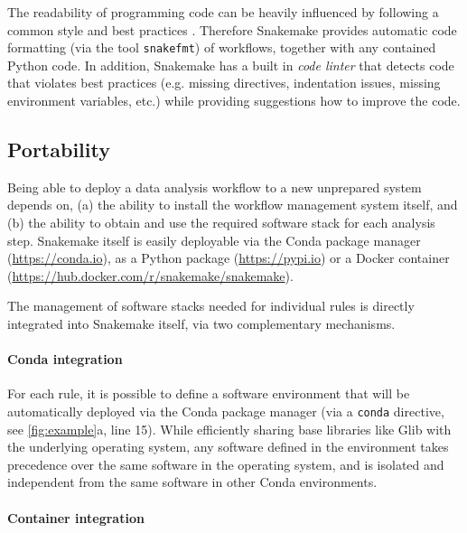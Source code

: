 \documentclass[parskip=half]{scrartcl}
\let\plainurl\url
\renewcommand{\url}[1]{\protect\plainurl{#1}}
\begin{document}
The readability of programming code can be heavily influenced by following a common style and best practices \parencite{tysell_sundkvist_code_2017}.
Therefore Snakemake provides automatic code formatting (via the tool \lstinline!snakefmt!) of workflows, together with any contained Python code.
In addition, Snakemake has a built in \emph{code linter} that detects code that violates best practices (e.g. missing directives, indentation issues, missing environment variables, etc.) while providing suggestions how to improve the code.

\subsection{Portability}\label{sec:portability}

Being able to deploy a data analysis workflow to a new unprepared system depends on, (a) the ability to install the workflow management system itself, and (b) the ability to obtain and use the required software stack for each analysis step.
Snakemake itself is easily deployable via the Conda package manager (\url{https://conda.io}), as a Python package (\url{https://pypi.io}) or a Docker container (\url{https://hub.docker.com/r/snakemake/snakemake}).

The management of software stacks needed for individual rules is directly integrated into Snakemake itself, via two complementary mechanisms.

\paragraph{Conda integration}

For each rule, it is possible to define a software environment that will be automatically deployed via the Conda package manager (via a \lstinline!conda! directive, see \autoref{fig:example}a, line 15).
While efficiently sharing base libraries like Glib with the underlying operating system, any software defined in the environment takes precedence over the same software in the operating system, and is isolated and independent from the same software in other Conda environments.

\paragraph{Container integration}
\end{document}
